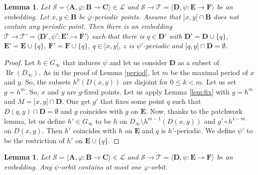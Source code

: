 \documentclass[JEP,XML,SOM,Unicode,NoFloatCountersInSection]{cedram}
\let\mathcal\mathscr
\theoremstyle{plain}
\newtheorem{lem}[thm]{Lemma}
\theoremstyle{definition}
\newcommand{\bA}{{\boldsymbol{A}}}
\newcommand{\bB}{{\boldsymbol{B}}}
\newcommand{\bC}{{\boldsymbol{C}}}
\newcommand{\bD}{{\boldsymbol{D}}}
\newcommand{\bE}{{\boldsymbol{E}}}
\newcommand{\bF}{{\boldsymbol{F}}}
\newcommand{\cL}{\mathcal{L}}
\newcommand{\cS}{\mathcal{S}}
\newcommand{\cT}{\mathcal{T}}
\DeclareMathOperator{\Br}{Br}
\begin{document}
\begin{lem}\label{lem:per} Let $\cS=\langle \bA,\varphi\colon\bB\to\bC\rangle\in\cL$ and $\cS\to \cT=\langle \bD,\psi\colon \bE\to\bF\rangle$ be an embedding. Let $x,y\in\bB$ be $\varphi$-periodic points. Assume that $]x,y[{}\cap\bB$ does not contain any periodic point. Then there is an embedding $\cT\to \cT'=\langle \bD',\psi'\colon \bE'\to\bF'\rangle$ such that there is $q\in \bD'$ with $\bD'=\bD\cup\{q\}$, $\bE'=\bE\cup\{q\}$, $\bF'=\bF\cup\{q\}$, $q\in{}]x,y[$, $z$ is $\psi'$-periodic and $]q,y[{}\cap\bD=\emptyset$.
\end{lem}

\begin{proof} Let $h\in G_\infty$ that induces $\psi$ and let us consider $\bD$ as a subset of $\Br(D_\infty)$. As in the proof of Lemma \ref{period}, let $m$ be the maximal period of $x$ and $y$. So, the subsets $h^k(D(x,y))$ are disjoint for $0 \leq k<m$. Let us set $g=h^m$. So, $x$ and $y$ are $g$-fixed points. Let us apply Lemma \ref{lem:fix} with $g=h^m$ and $M=]x,y[{}\cap \bD$. One get $g'$ that fixes some point $q$ such that $D(q,y)\cap \bD=\emptyset$ and $g$ coincides with $g$ on $\bE$. Now, thanks to the patchwork lemma, let us define $h'\in G_\infty$ to be $h$ on $D_\infty\setminus h^{m-1}(D(x,y))$ and $g'\circ h^{1-m}$ on $D(x,y)$. Then $h'$ coincides with $h$ on $\bE$ and $q$ is $h'$-periodic. We define $\psi'$ to be the restriction of $h'$ on $\bE\cup\{q\}$.
\end{proof}

\begin{lem}\label{atmostoneorbit}Let $\cS=\langle \bA,\varphi\colon\bB\to\bC\rangle\in\cL$ and $\cS\to \cT=\langle \bD,\psi\colon \bE\to\bF\rangle$ be an embedding. Any $\psi$-orbit contains at most one $\varphi$-orbit.\end{lem}
\end{document}
